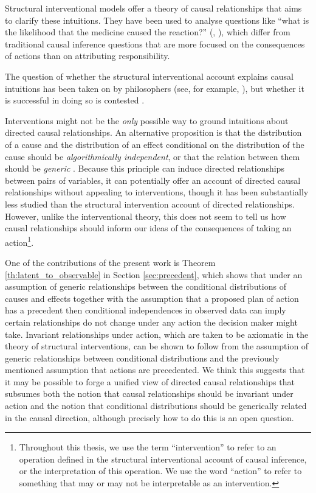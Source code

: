 Structural interventional models offer a theory of causal relationships that aims to clarify these intuitions. They have been used to analyse questions like ``what is the likelihood that the medicine caused the reaction?'' (\citet[ch. ~9]{pearl_causality:_2009}, \citet{pearl_causes_2015}), which differ from traditional causal inference questions that are more focused on the consequences of actions than on attributing responsibility. 

The question of whether the structural interventional account explains causal intuitions has been taken on by philosophers (see, for example, \citet{woodward_causation_2016}), but whether it is successful in doing so is contested \citep{cartwright_modularity_2001}.

Interventions might not be the \emph{only} possible way to ground intuitions about directed causal relationships. An alternative proposition is that the distribution of a cause and the distribution of an effect conditional on the distribution of the cause should be \emph{algorithmically independent}, or that the relation between them should be \emph{generic} \citep{lemeire_replacing_2013}. Because this principle can induce directed relationships between pairs of variables, it can potentially offer an account of directed causal relationships without appealing to interventions, though it has been substantially less studied than the structural intervention account of directed relationships. However, unlike the interventional theory, this does not seem to tell us how causal relationships should inform our ideas of the consequences of taking an action\footnote{Throughout this thesis, we use the term ``intervention'' to refer to an operation defined in the structural interventional account of causal inference, or the interpretation of this operation. We use the word ``action'' to refer to something that may or may not be interpretable as an intervention.}.

One of the contributions of the present work is Theorem \ref{th:latent_to_observable} in Section \ref{sec:precedent}, which shows that under an assumption of generic relationships between the conditional distributions of causes and effects together with the assumption that a proposed plan of action has a precedent then conditional independences in observed data can imply certain relationships do not change under any action the decision maker might take. Invariant relationships under action, which are taken to be axiomatic in the theory of structural interventions, can be shown to follow from the assumption of generic relationships between conditional distributions and the previously mentioned assumption that actions are precedented. We think this suggests that it may be possible to forge a unified view of directed causal relationships that subsumes both the notion that causal relationships should be invariant under action and the notion that conditional distributions should be generically related in the causal direction, although precisely how to do this is an open question.

